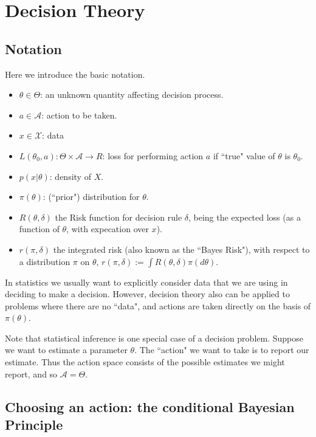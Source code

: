 \documentclass[12pt]{article}
\def\A{\mathcal A}
\def\X{\mathcal X}
\begin{document}
\normalsize

\section{Decision Theory}

\subsection{Notation}

Here we introduce the basic notation.
\begin{itemize}
\item $\theta \in \Theta$: an unknown quantity affecting decision process.
\item $a \in \A$: action to be taken.
\item $x \in \X$: data
\item $L(\theta_0, a): \Theta \times \A \rightarrow R$: loss for performing action $a$ if ``true" value of $\theta$ is $\theta_0$. 
\item $p(x | \theta)$: density of $X$.
\item $\pi(\theta)$: (``prior") distribution for $\theta$.
\item $R(\theta,\delta)$ the Risk function for decision rule $\delta$, being the expected loss (as a function of $\theta$, with expecation over $x$).
\item $r(\pi, \delta)$ the integrated risk (also known as the ``Bayes Risk"), with respect to a distribution $\pi$ on $\theta$, $r(\pi,\delta) := \int R(\theta,\delta) \pi(d\theta)$.
\end{itemize}

In statistics we usually want to explicitly consider 
data that we are using in deciding
to make a decision. However, decision theory also can be
applied to problems where there are no ``data", and actions are taken directly
on the basis of $\pi(\theta)$.

Note that statistical inference is one special case of
a decision problem. Suppose we want to estimate a parameter $\theta$.
The ``action" we want to take is to report our estimate. 
Thus the action space consists of the possible estimates we might report,
and so $\A=\Theta$.

\subsection{Choosing an action: the conditional Bayesian Principle}
\end{document}
